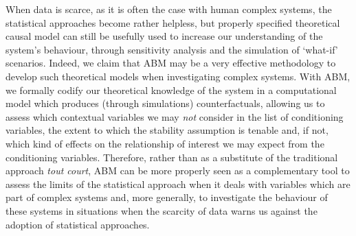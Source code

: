 \documentclass[review]{elsarticle}
\begin{document}
When data is scarce, as it is often the case with human complex systems, the statistical approaches become rather helpless, but properly specified theoretical causal model can still be usefully used to increase our understanding of the system's behaviour, through sensitivity analysis and the simulation of `what-if' scenarios. Indeed, we claim that ABM may be a very effective methodology to develop such theoretical models when investigating complex systems. With ABM, we formally codify our theoretical knowledge of the system in a computational model which produces (through simulations) counterfactuals, allowing us to assess which contextual variables we may \textit{not} consider in the list of conditioning variables, the extent to which the stability assumption is tenable and, if not, which kind of effects on the relationship of interest we may expect from the conditioning variables. Therefore, rather than as a substitute of the traditional approach \textit{tout court}, ABM can be more properly seen as a complementary tool to assess the limits of the statistical approach when it deals with variables which are part of complex systems and, more generally, to investigate the behaviour of these systems in situations when the scarcity of data warns us against the adoption of statistical approaches.

% 
% 
\end{document}
